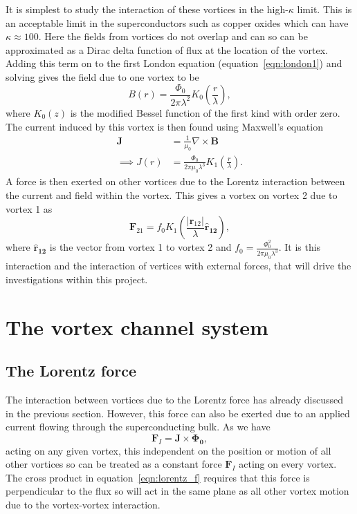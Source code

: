 \documentclass{article}
\numberwithin{equation}{section}
\begin{document}
It is simplest to study the interaction of these vortices in the high-$\kappa$ limit. This is an acceptable limit in the superconductors such as copper oxides which can have $\kappa \approx 100$. Here the fields from vortices do not overlap and can so can be approximated as a Dirac delta function of flux at the location of the vortex. Adding this term on to the first London equation (equation~\ref{eqn:london1}) and solving gives the field due to one vortex to be \cite{Poole2014Superconductivity}
\begin{equation}
    B(r) = \frac{\Phi_0}{2\pi\lambda^2}K_0\left(\frac{r}{\lambda}\right),
\end{equation}
where $K_0(z)$ is the modified Bessel function of the first kind with order zero. The current induced by this vortex is then found using Maxwell's equation
\begin{align}
    \mathbf{J} &= \frac{1}{\mu_0}\nabla\times\mathbf{B} \nonumber \\
    \implies J(r) &= \frac{\Phi_0}{2\pi\mu_0\lambda^3}K_1\left(\frac{r}{\lambda}\right).
\end{align}
A force is then exerted on other vortices due to the Lorentz interaction between the current and field within the vortex. This gives a vortex on vortex 2 due to vortex 1 as
\begin{equation}
    \mathbf{F}_{21} = f_0K_1\left(\frac{|\mathbf{r}_{12}|}{\lambda}\mathbf{\hat{r}_{12}}\right), \label{eqn:vortex_force}
\end{equation}
where $\mathbf{\hat{r}_{12}}$ is the vector from vortex 1 to vortex 2 and $f_0 = \frac{\Phi_0^2}{2\pi\mu_0\lambda^3}$. It is this interaction and the interaction of vertices with external forces, that will drive the investigations within this project.

\section{The vortex channel system}
\subsection{The Lorentz force}
The interaction between vortices due to the Lorentz force has already discussed in the previous section. However, this force can also be exerted due to an applied current flowing through the superconducting bulk. As we have
\begin{equation}
    \mathbf{F}_I = \mathbf{J} \times \mathbf{\Phi_0}, \label{eqn:lorentz_f}
\end{equation}
acting on any given vortex, this independent on the position or motion of all other vortices so can be treated as a constant force $\mathbf{F}_I$ acting on every vortex. The cross product in equation~\ref{eqn:lorentz_f} requires that this force is perpendicular to the flux so will act in the same plane as all other vortex motion due to the vortex-vortex interaction.
\end{document}
